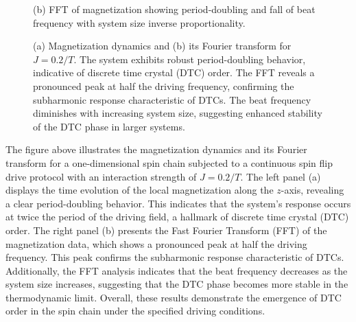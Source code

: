 \documentclass[a4paper, 11pt]{article}
\begin{document}
\begin{figure}[h!]
\begin{minipage}[t]{0.48\textwidth}
        \caption*{(b) FFT of magnetization showing period-doubling and fall of beat frequency with system size inverse proportionality.}
    \end{minipage}
    \caption{(a) Magnetization dynamics and (b) its Fourier transform for $J = 0.2/T$. The system exhibits robust period-doubling behavior, indicative of discrete time crystal (DTC) order. The FFT reveals a pronounced peak at half the driving frequency, confirming the subharmonic response characteristic of DTCs. The beat frequency diminishes with increasing system size, suggesting enhanced stability of the DTC phase in larger systems.}
\end{figure}

The figure above illustrates the magnetization dynamics and its Fourier transform for a one-dimensional spin chain subjected to a continuous spin flip drive protocol with an interaction strength of $J = 0.2/T$. The left panel (a) displays the time evolution of the local magnetization along the $z$-axis, revealing a clear period-doubling behavior. This indicates that the system's response occurs at twice the period of the driving field, a hallmark of discrete time crystal (DTC) order. The right panel (b) presents the Fast Fourier Transform (FFT) of the magnetization data, which shows a pronounced peak at half the driving frequency. This peak confirms the subharmonic response characteristic of DTCs. Additionally, the FFT analysis indicates that the beat frequency decreases as the system size increases, suggesting that the DTC phase becomes more stable in the thermodynamic limit. Overall, these results demonstrate the emergence of DTC order in the spin chain under the specified driving conditions.

\newpage
\end{document}
